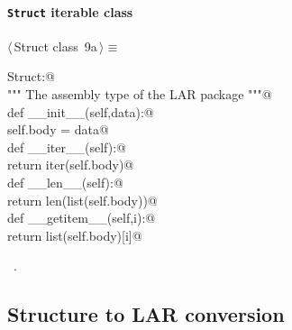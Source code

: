 \documentclass[11pt,oneside]{article}	%
\begin{document}
\paragraph{\texttt{Struct} iterable class}
\begin{flushleft} \small \label{scrap24}
\protect{}$\langle\,$Struct class\nobreak\ {\footnotesize 9a}$\,\rangle\equiv$
\vspace{-1ex}
\begin{list}{}{} \item
\mbox{}\verb@class Struct:@\\
\mbox{}\verb@    """ The assembly type of the LAR package """@\\
\mbox{}\verb@    def __init__(self,data):@\\
\mbox{}\verb@        self.body = data@\\
\mbox{}\verb@    def __iter__(self):@\\
\mbox{}\verb@        return iter(self.body)@\\
\mbox{}\verb@    def __len__(self):@\\
\mbox{}\verb@        return len(list(self.body))@\\
\mbox{}\verb@    def __getitem__(self,i):@\\
\mbox{}\verb@        return list(self.body)[i]@\\
\mbox{}\verb@@{\NWsep}
\end{list}
\vspace{-1ex}
\footnotesize\addtolength{\baselineskip}{-1ex}
\begin{list}{}{\setlength{\itemsep}{-\parsep}\setlength{\itemindent}{-\leftmargin}}
\item \NWtxtMacroRefIn\ .
\end{list}
\end{flushleft}


\subsection{Structure to LAR conversion}
\end{document}
